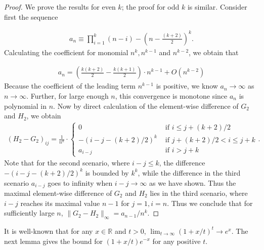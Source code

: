 \documentclass[a4paper]{article}
\newcommand{\RR}{\mathbb{R}}
\begin{document}
\begin{proof}
We prove the results for even $k$; the proof for odd $k$ is similar. Consider first the sequence

\begin{align*}
a_n \equiv \prod_{i=1}^k (n-i) - (n-\frac{(k+2)}{2})^k.
\end{align*}
Calculating the coefficient for monomial $n^k, n^{k-1}$ and $n^{k-2}$, we obtain that

\begin{align*}
a_n = (\frac{k(k+2)}{2} - \frac{k(k+1)}{2})\cdot n^{k-1} + O(n^{k-2})
\end{align*}
Because the coefficient of the leading term $n^{k-1}$ is positive, we know $a_n\rightarrow \infty$ as $n\rightarrow \infty$. Further, for large enough $n$, this convergence is monotone since $a_n$ is polynomial in $n$. Now by direct calculation of the element-wise difference of $G_2$ and $H_2$, we obtain
\begin{align*}
(H_2-G_2)_{ij} = \frac{1}{n^k}\cdot
\begin{cases}
0 & \text{ if } i\leq j + (k+2)/2\\
-(i-j - (k+2)/2)^k & \text{ if } j + (k+2)/2 < i \leq j + k\\
a_{i-j} &\text{ if } i > j+k
\end{cases}.
\end{align*}
Note that for the second scenario, where $i - j\leq k$, the difference $-(i-j-(k+2)/2)^k$ is bounded by $k^k$, while the difference in the third scenario $a_{i-j}$ goes to infinity when $i-j\rightarrow \infty$ as we have shown. Thus the maximal element-wise difference of $G_2$ and $H_2$ lies in the third scenario, where $i-j$ reaches its maximal value $n-1$ for $j = 1, i = n$. Thus we conclude that for sufficiently large $n$, $\|G_2-H_2\|_\infty = a_{n-1}/n^k$.
\end{proof}

It is well-known that for any $x\in\RR$ and $t>0$, $\lim_{t\rightarrow\infty}(1 + x/t)^t \rightarrow e^x$. The next lemma gives the bound for $(1+x/t)e^{-x}$ for any positive $t$.
\end{document}
